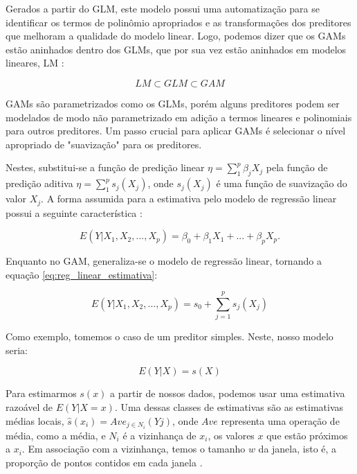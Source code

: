 \documentclass[
    12pt,               %
    openright,          %
    oneside,            %
    a4paper,            %
    english,            %
    brazil              %
    ]{abntex2}
\begin{document}
Gerados a partir do GLM, este modelo possui uma automatização para se identificar os termos de polinômio apropriados
e as transformações dos preditores que melhoram a qualidade do modelo linear. Logo, podemos dizer que os GAMs estão
aninhados dentro dos GLMs, que por sua vez estão aninhados em modelos lineares, LM \cite{GAMeGLM_especie_estudo}:

\begin{equation}
    LM \subset GLM \subset GAM
\end{equation}

GAMs são parametrizados como os GLMs, porém alguns preditores podem ser modelados de modo não parametrizado em 
adição a termos lineares e polinomiais para outros preditores. Um passo crucial para aplicar GAMs é selecionar
o nível apropriado de "suavização" para os preditores.

Nestes, substitui-se a função de predição linear $\eta = \sum_{1}^{p}\beta_jX_j$ pela função de predição aditiva 
$\eta = \sum_{1}^{p}s_j(X_j)$, onde $s_j(X_j)$ é uma função de suavização do valor $X_j$. A forma assumida
para a estimativa pelo modelo de regressão linear possui a seguinte característica \cite{GAM}:

\begin{equation}
    \label{eq:reg_linear_estimativa}
    E(Y|X_1,X_2,...,X_p) = \beta_0 + \beta_1X_1 + ... + \beta_pX_p.
\end{equation}

Enquanto no GAM, generaliza-se o modelo de regressão linear, tornando a equação \ref{eq:reg_linear_estimativa}:

\begin{equation}
    \label{eq:reg_linear_generalizada}
    E(Y|X_1,X_2,...,X_p) = s_0 + \sum_{j=1}^{p} s_j(X_j)
\end{equation}

Como exemplo, tomemos o caso de um preditor simples. Neste, nosso modelo seria:

\begin{equation}
    \label{eq:preditor_simples}
    E(Y|X) = s(X)
\end{equation}

Para estimarmos $s(x)$ a partir de nossos dados, podemos usar uma estimativa razoável de $E(Y|X=x)$. Uma dessas 
classes de estimativas são as estimativas médias locais, $\hat{s}(x_i) = Ave_{j \in N_i}(Yj)$, onde $Ave$ representa uma
operação de média, como a média, e $N_i$ é a vizinhança de $x_i$, os valores $x$ que estão próximos a $x_i$. Em
associação com a vizinhança, temos o tamanho $w$ da janela, isto é, a proporção de pontos contidos em cada janela \cite{GAM}.
\end{document}
